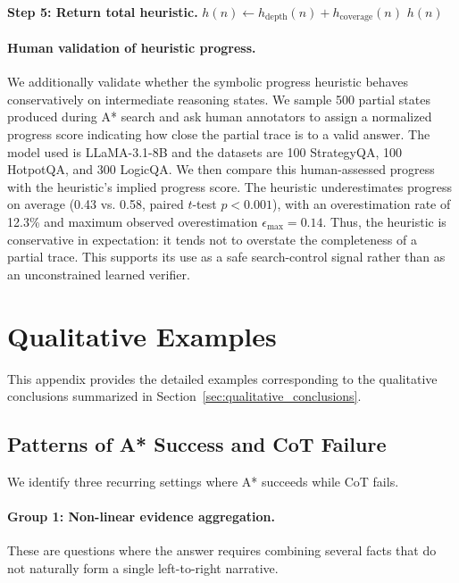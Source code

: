 \documentclass[11pt]{article}
\begin{document}
{\begin{algorithm}[t]
\BlankLine
\textbf{Step 5: Return total heuristic.}\;
\(h(n) \leftarrow h_{\mathrm{depth}}(n)+h_{\mathrm{coverage}}(n)\)\;
\Return \(h(n)\)\;
\end{algorithm}

\paragraph{Human validation of heuristic progress.}
We additionally validate whether the symbolic progress heuristic behaves
conservatively on intermediate reasoning states. We sample 500 partial
states produced during A* search and ask human annotators to assign a
normalized progress score indicating how close the partial trace is to a
valid answer. The model used is LLaMA-3.1-8B and the datasets are 100 StrategyQA, 100 HotpotQA, and 300 LogicQA. We then compare this human-assessed progress with the
heuristic's implied progress score. The heuristic underestimates progress
on average (0.43 vs. 0.58, paired \(t\)-test \(p<0.001\)), with an
overestimation rate of 12.3\% and maximum observed overestimation
\(\epsilon_{\max}=0.14\). Thus, the heuristic is conservative in
expectation: it tends not to overstate the completeness of a partial
trace. This supports its use as a safe search-control signal rather than
as an unconstrained learned verifier.


















\section{Qualitative Examples}
\label{app:qualitative_examples}

This appendix provides the detailed examples corresponding to the qualitative conclusions summarized in Section~\ref{sec:qualitative_conclusions}.

\subsection{Patterns of A* Success and CoT Failure}
\label{app:astar_success}

We identify three recurring settings where A* succeeds while CoT fails.

\paragraph{Group 1: Non-linear evidence aggregation.}
These are questions where the answer requires combining several facts that do not naturally form a single left-to-right narrative.

}
\end{document}
